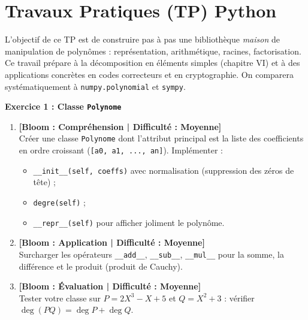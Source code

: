 \section*{Travaux Pratiques (TP) Python}

\vspace{0.3cm}
\noindent L'objectif de ce TP est de construire pas à pas une bibliothèque \emph{maison} de manipulation de polynômes : représentation, arithmétique, racines, factorisation. Ce travail prépare à la décomposition en éléments simples (chapitre VI) et à des applications concrètes en codes correcteurs et en cryptographie. On comparera systématiquement à \texttt{numpy.polynomial} et \texttt{sympy}.

\vspace{0.3cm}

\noindent\textbf{Exercice 1 : Classe \texttt{Polynome}}
\begin{enumerate}
    \item \textbf{[Bloom : Compréhension | Difficulté : Moyenne]} \\
    Créer une classe \texttt{Polynome} dont l'attribut principal est la liste des coefficients en ordre croissant (\texttt{[a0, a1, ..., an]}). Implémenter :
    \begin{itemize}
        \item \texttt{\_\_init\_\_(self, coeffs)} avec normalisation (suppression des zéros de tête) ;
        \item \texttt{degre(self)} ;
        \item \texttt{\_\_repr\_\_(self)} pour afficher joliment le polynôme.
    \end{itemize}
    \item \textbf{[Bloom : Application | Difficulté : Moyenne]} \\
    Surcharger les opérateurs \texttt{\_\_add\_\_}, \texttt{\_\_sub\_\_}, \texttt{\_\_mul\_\_} pour la somme, la différence et le produit (produit de Cauchy).
    \item \textbf{[Bloom : Évaluation | Difficulté : Moyenne]} \\
    Tester votre classe sur $P = 2X^3 - X + 5$ et $Q = X^2 + 3$ : vérifier $\deg(PQ) = \deg P + \deg Q$.
\end{enumerate}

\vspace{0.3cm}

